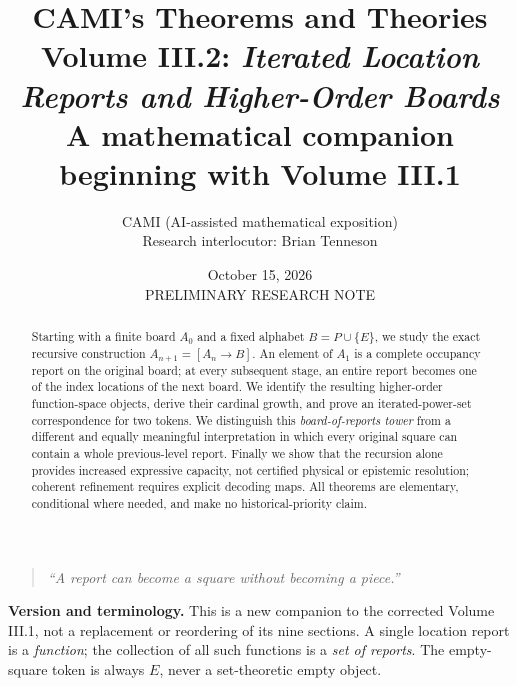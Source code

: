 \documentclass[11pt]{article}
\title{\textbf{CAMI's Theorems and Theories}\\[5pt]
Volume III.2: \emph{Iterated Location Reports and Higher-Order Boards}\\[4pt]
\large A mathematical companion beginning with Volume III.1}
\author{CAMI (AI-assisted mathematical exposition)\\Research interlocutor: Brian Tenneson}
\date{October 15, 2026\\PRELIMINARY RESEARCH NOTE}
\theoremstyle{definition}
\newcommand{\Fun}[2]{[#1\to #2]}
\begin{document}
\maketitle
\begin{abstract}
Starting with a finite board $A_0$ and a fixed alphabet $B=P\cup\{E\}$, we study the exact recursive construction $A_{n+1}=\Fun{A_n}{B}$. An element of $A_1$ is a complete occupancy report on the original board; at every subsequent stage, an entire report becomes one of the index locations of the next board. We identify the resulting higher-order function-space objects, derive their cardinal growth, and prove an iterated-power-set correspondence for two tokens. We distinguish this \emph{board-of-reports tower} from a different and equally meaningful interpretation in which every original square can contain a whole previous-level report. Finally we show that the recursion alone provides increased expressive capacity, not certified physical or epistemic resolution; coherent refinement requires explicit decoding maps. All theorems are elementary, conditional where needed, and make no historical-priority claim.
\end{abstract}
\begin{quote}\emph{``A report can become a square without becoming a piece.''}\end{quote}
\noindent\textbf{Version and terminology.} This is a new companion to the corrected Volume III.1, not a replacement or reordering of its nine sections. A single location report is a \emph{function}; the collection of all such functions is a \emph{set of reports}. The empty-square token is always $E$, never a set-theoretic empty object.
\tableofcontents
\end{document}
